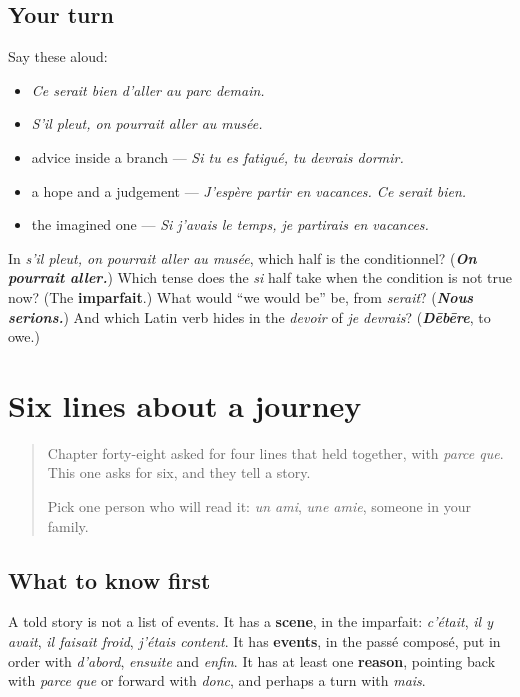 \subsection*{Your turn}
Say these aloud:

\begin{itemize}
\raggedright
  \item \emph{Ce serait bien d'aller au parc demain.}
  \item \emph{S'il pleut, on pourrait aller au musée.}
  \item advice inside a branch — \emph{Si tu es fatigué, tu devrais dormir.}
  \item a hope and a judgement — \emph{J'espère partir en vacances. Ce serait bien.}
  \item the imagined one — \emph{Si j'avais le temps, je partirais en vacances.}
\end{itemize}

\begin{tcolorbox}[breakable,colback=teal!4,colframe=teal!35!black,title={Before you move on}]
In \emph{s'il pleut, on pourrait aller au musée}, which half is the conditionnel? (\emph{\textbf{On pourrait aller.}}) Which tense does the \emph{si} half take when the condition is not true now? (The \textbf{imparfait}.) What would \textquotedblleft{}we would be\textquotedblright{} be, from \emph{serait}? (\emph{\textbf{Nous serions.}}) And which Latin verb hides in the \emph{devoir} of \emph{je devrais}? (\emph{\textbf{Dēbēre}}, to owe.)
\end{tcolorbox}
\section[(six lignes)]{Six lines about a journey}

\label{lesson:FR-W267-six-lignes}



\begin{quote}
Chapter forty-eight asked for four lines that held together, with \emph{parce que}. This one asks for six, and they tell a story.

Pick one person who will read it: \emph{un ami}, \emph{une amie}, someone in your family.
\end{quote}

\subsection*{What to know first}
A told story is not a list of events. It has a \textbf{scene}, in the imparfait: \emph{c'était}, \emph{il y avait}, \emph{il faisait froid}, \emph{j'étais content}. It has \textbf{events}, in the passé composé, put in order with \emph{d'abord}, \emph{ensuite} and \emph{enfin}. It has at least one \textbf{reason}, pointing back with \emph{parce que} or forward with \emph{donc}, and perhaps a turn with \emph{mais}.

